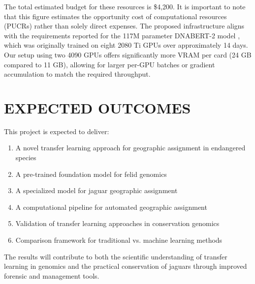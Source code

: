 The total estimated budget for these resources is \$4,200. It is important to note that this figure estimates the opportunity cost of computational resources (PUCRs) rather than solely direct expenses. The proposed infrastructure aligns with the requirements reported for the 117M parameter DNABERT-2 model \cite{zhou2024dnabert}, which was originally trained on eight 2080 Ti GPUs over approximately 14 days. Our setup using two 4090 GPUs offers significantly more VRAM per card (24 GB compared to 11 GB), allowing for larger per-GPU batches or gradient accumulation to match the required throughput.

\section{EXPECTED OUTCOMES}

This project is expected to deliver:

\begin{enumerate}
	\item A novel transfer learning approach for geographic assignment in endangered species
	\item A pre-trained foundation model for felid genomics
	\item A specialized model for jaguar geographic assignment
	\item A computational pipeline for automated geographic assignment
	\item Validation of transfer learning approaches in conservation genomics
	\item Comparison framework for traditional vs. machine learning methods
\end{enumerate}

The results will contribute to both the scientific understanding of transfer learning in genomics and the practical conservation of jaguars through improved forensic and management tools.
